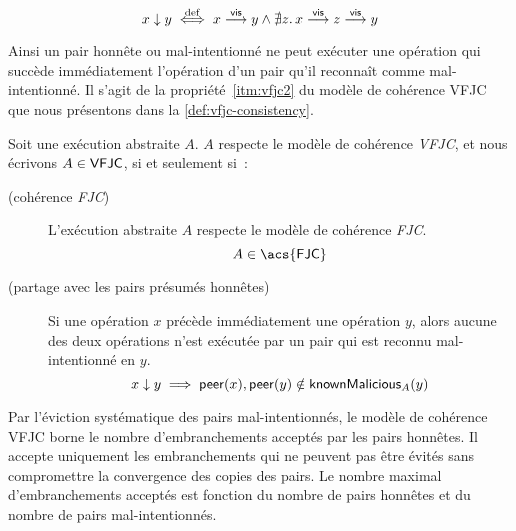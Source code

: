 \begin{equation*}
    x \downarrow y \overset{\mathrm{def}}{\iff} x \overset{\mathsf{vis}}{\longrightarrow} y \land \nexists z \ldotp x \overset{\mathsf{vis}}{\longrightarrow} z \overset{\mathsf{vis}}{\longrightarrow} y
\end{equation*}

Ainsi un pair honnête ou mal-intentionné ne peut exécuter une opération qui succède immédiatement l'opération d'un pair qu'il reconnaît comme mal-intentionné.
Il s'agit de la propriété~\ref{itm:vfjc2} du modèle de cohérence \acf{VFJC} que nous présentons dans la \autoref{def:vfjc-consistency}.

\begin{definition}\label{def:vfjc-consistency}
  Soit une exécution abstraite $A$. $A$ respecte le modèle de cohérence \emph{\acf{VFJC}}, et nous écrivons $A \in \operatorname{\mathsf{VFJC}}$, si et seulement si~:

  \begin{description}
  \item[ (cohérence \emph{\acl{FJC}})]
  L'exécution abstraite $A$ respecte le modèle de cohérence \emph{\ac{FJC}}.
  \begin{equation*}
    A \in \trm{\acs{FJC}}
  \end{equation*}

  \item[ (partage avec les pairs présumés honnêtes)]
  Si une opération $x$ précède immédiatement une opération $y$, alors aucune des deux opérations n'est exécutée par un pair qui est reconnu mal-intentionné en $y$.
  \begin{equation*}
    x \downarrow y \implies \operatorname{\mathsf{peer}}(x), \operatorname{\mathsf{peer}}(y) \notin \operatorname{\mathsf{knownMalicious}}_A(y)
  \end{equation*}
  \end{description}
\end{definition}

Par l'éviction systématique des pairs mal-intentionnés, le modèle de cohérence \ac{VFJC} borne le nombre d'embranchements acceptés par les pairs honnêtes.
Il accepte uniquement les embranchements qui ne peuvent pas être évités sans compromettre la convergence des copies des pairs.
Le nombre maximal d'embranchements acceptés est fonction du nombre de pairs honnêtes et du nombre de pairs mal-intentionnés.

